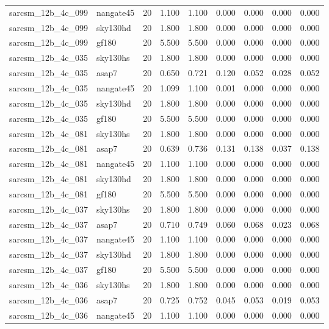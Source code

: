\begin{tabular}{llrrrrrrr}
sarcsm\_12b\_4c\_099 & nangate45 & 20 & 1.100 & 1.100 & 0.000 & 0.000 & 0.000 & 0.000 \\
sarcsm\_12b\_4c\_099 & sky130hd & 20 & 1.800 & 1.800 & 0.000 & 0.000 & 0.000 & 0.000 \\
sarcsm\_12b\_4c\_099 & gf180 & 20 & 5.500 & 5.500 & 0.000 & 0.000 & 0.000 & 0.000 \\
sarcsm\_12b\_4c\_035 & sky130hs & 20 & 1.800 & 1.800 & 0.000 & 0.000 & 0.000 & 0.000 \\
sarcsm\_12b\_4c\_035 & asap7 & 20 & 0.650 & 0.721 & 0.120 & 0.052 & 0.028 & 0.052 \\
sarcsm\_12b\_4c\_035 & nangate45 & 20 & 1.099 & 1.100 & 0.001 & 0.000 & 0.000 & 0.000 \\
sarcsm\_12b\_4c\_035 & sky130hd & 20 & 1.800 & 1.800 & 0.000 & 0.000 & 0.000 & 0.000 \\
sarcsm\_12b\_4c\_035 & gf180 & 20 & 5.500 & 5.500 & 0.000 & 0.000 & 0.000 & 0.000 \\
sarcsm\_12b\_4c\_081 & sky130hs & 20 & 1.800 & 1.800 & 0.000 & 0.000 & 0.000 & 0.000 \\
sarcsm\_12b\_4c\_081 & asap7 & 20 & 0.639 & 0.736 & 0.131 & 0.138 & 0.037 & 0.138 \\
sarcsm\_12b\_4c\_081 & nangate45 & 20 & 1.100 & 1.100 & 0.000 & 0.000 & 0.000 & 0.000 \\
sarcsm\_12b\_4c\_081 & sky130hd & 20 & 1.800 & 1.800 & 0.000 & 0.000 & 0.000 & 0.000 \\
sarcsm\_12b\_4c\_081 & gf180 & 20 & 5.500 & 5.500 & 0.000 & 0.000 & 0.000 & 0.000 \\
sarcsm\_12b\_4c\_037 & sky130hs & 20 & 1.800 & 1.800 & 0.000 & 0.000 & 0.000 & 0.000 \\
sarcsm\_12b\_4c\_037 & asap7 & 20 & 0.710 & 0.749 & 0.060 & 0.068 & 0.023 & 0.068 \\
sarcsm\_12b\_4c\_037 & nangate45 & 20 & 1.100 & 1.100 & 0.000 & 0.000 & 0.000 & 0.000 \\
sarcsm\_12b\_4c\_037 & sky130hd & 20 & 1.800 & 1.800 & 0.000 & 0.000 & 0.000 & 0.000 \\
sarcsm\_12b\_4c\_037 & gf180 & 20 & 5.500 & 5.500 & 0.000 & 0.000 & 0.000 & 0.000 \\
sarcsm\_12b\_4c\_036 & sky130hs & 20 & 1.800 & 1.800 & 0.000 & 0.000 & 0.000 & 0.000 \\
sarcsm\_12b\_4c\_036 & asap7 & 20 & 0.725 & 0.752 & 0.045 & 0.053 & 0.019 & 0.053 \\
sarcsm\_12b\_4c\_036 & nangate45 & 20 & 1.100 & 1.100 & 0.000 & 0.000 & 0.000 & 0.000 \\

\end{tabular}
